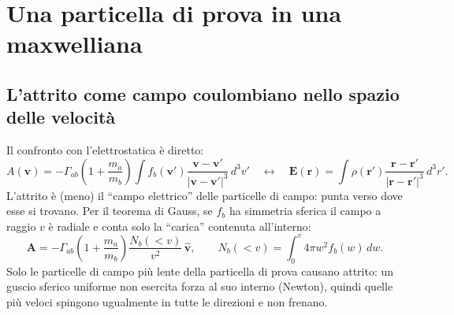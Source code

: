 \section{Una particella di prova in una maxwelliana}
\subsection{L'attrito come campo coulombiano nello spazio delle velocità}
Il confronto con l'elettrostatica è diretto:
\begin{equation}
A(\mathbf{v})=-\Gamma_{ab}\left(1+\frac{m_a}{m_b}\right)\int f_b(\mathbf{v}')\frac{\mathbf{v}-\mathbf{v}'}{|\mathbf{v}-\mathbf{v}'|^3}\,d^3v'\quad\longleftrightarrow\quad\mathbf{E}(\mathbf{r})=\int\rho(\mathbf{r}')\frac{\mathbf{r}-\mathbf{r}'}{|\mathbf{r}-\mathbf{r}'|^3}\,d^3r'.
\end{equation}
L'attrito è (meno) il ``campo elettrico'' delle particelle di campo: punta verso dove esse si trovano. Per il teorema di Gauss, se $f_b$ ha simmetria sferica il campo a raggio $v$ è radiale e conta solo la ``carica'' contenuta all'interno:
\begin{equation}
\mathbf{A}=-\Gamma_{ab}\left(1+\frac{m_a}{m_b}\right)\frac{N_b(<v)}{v^2}\,\hat{\mathbf{v}},\qquad N_b(<v)=\int_0^v4\pi w^2f_b(w)\,dw .
\end{equation}
Solo le particelle di campo più lente della particella di prova causano attrito: un guscio sferico uniforme non esercita forza al suo interno (Newton), quindi quelle più veloci spingono ugualmente in tutte le direzioni e non frenano.

